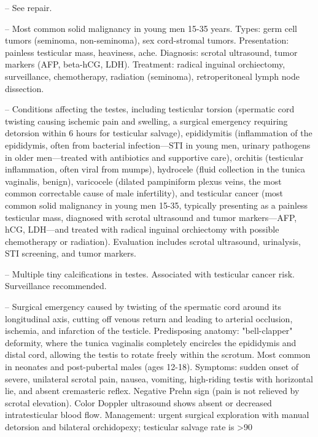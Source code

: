 -- See repair.

-- Most common solid malignancy in young men 15-35 years. Types: germ cell tumors (seminoma, non-seminoma), sex cord-stromal tumors. Presentation: painless testicular mass, heaviness, ache. Diagnosis: scrotal ultrasound, tumor markers (AFP, beta-hCG, LDH). Treatment: radical inguinal orchiectomy, surveillance, chemotherapy, radiation (seminoma), retroperitoneal lymph node dissection.

-- Conditions affecting the testes, including testicular torsion (spermatic cord twisting causing ischemic pain and swelling, a surgical emergency requiring detorsion within 6 hours for testicular salvage), epididymitis (inflammation of the epididymis, often from bacterial infection—STI in young men, urinary pathogens in older men—treated with antibiotics and supportive care), orchitis (testicular inflammation, often viral from mumps), hydrocele (fluid collection in the tunica vaginalis, benign), varicocele (dilated pampiniform plexus veins, the most common correctable cause of male infertility), and testicular cancer (most common solid malignancy in young men 15-35, typically presenting as a painless testicular mass, diagnosed with scrotal ultrasound and tumor markers—AFP, hCG, LDH—and treated with radical inguinal orchiectomy with possible chemotherapy or radiation). Evaluation includes scrotal ultrasound, urinalysis, STI screening, and tumor markers.

-- Multiple tiny calcifications in testes. Associated with testicular cancer risk. Surveillance recommended.

-- Surgical emergency caused by twisting of the spermatic cord around its longitudinal axis, cutting off venous return and leading to arterial occlusion, ischemia, and infarction of the testicle. Predisposing anatomy: "bell-clapper" deformity, where the tunica vaginalis completely encircles the epididymis and distal cord, allowing the testis to rotate freely within the scrotum. Most common in neonates and post-pubertal males (ages 12-18). Symptoms: sudden onset of severe, unilateral scrotal pain, nausea, vomiting, high-riding testis with horizontal lie, and absent cremasteric reflex. Negative Prehn sign (pain is not relieved by scrotal elevation). Color Doppler ultrasound shows absent or decreased intratesticular blood flow. Management: urgent surgical exploration with manual detorsion and bilateral orchidopexy; testicular salvage rate is >90%


